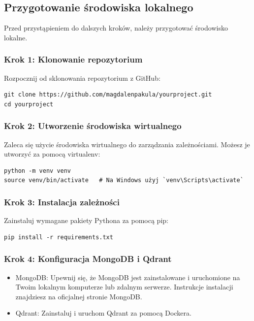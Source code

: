 \documentclass[a4paper, 12pt]{article}
\begin{document}
\subsection{Przygotowanie środowiska lokalnego}

Przed przystąpieniem do dalszych kroków, należy przygotować środowisko lokalne.

\subsubsection*{Krok 1: Klonowanie repozytorium}

Rozpocznij od sklonowania repozytorium z GitHub:
\begin{verbatim}
git clone https://github.com/magdalenpakula/yourproject.git
cd yourproject
\end{verbatim}

\subsubsection*{Krok 2: Utworzenie środowiska wirtualnego}

Zaleca się użycie środowiska wirtualnego do zarządzania zależnościami. Możesz je utworzyć za pomocą virtualenv:
\begin{verbatim}
python -m venv venv
source venv/bin/activate   # Na Windows użyj `venv\Scripts\activate`
\end{verbatim}

\subsubsection*{Krok 3: Instalacja zależności}

Zainstaluj wymagane pakiety Pythona za pomocą pip:
\begin{verbatim}
pip install -r requirements.txt
\end{verbatim}

\subsubsection*{Krok 4: Konfiguracja MongoDB i Qdrant}
\begin{itemize}
    \item MongoDB: Upewnij się, że MongoDB jest zainstalowane i uruchomione na Twoim lokalnym komputerze lub zdalnym serwerze. Instrukcje instalacji znajdziesz na oficjalnej stronie MongoDB.
    \item Qdrant: Zainstaluj i uruchom Qdrant za pomocą Dockera.
\end{itemize}
\end{document}
